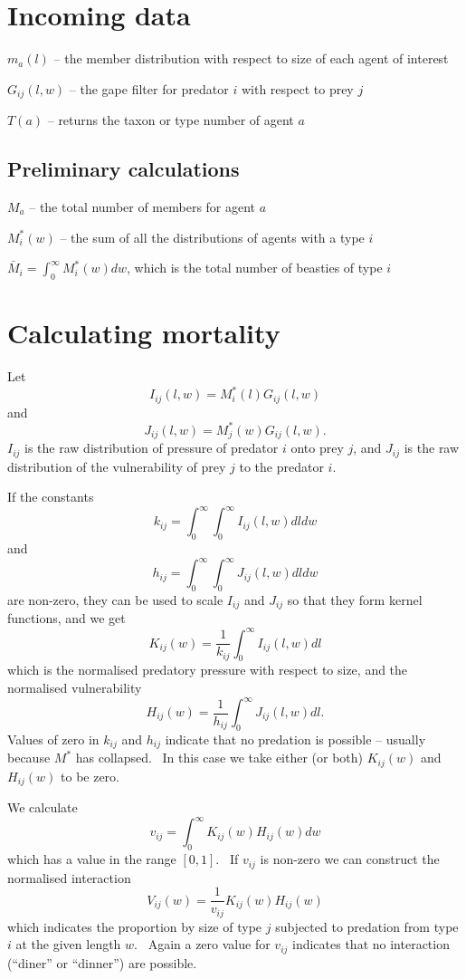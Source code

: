 \documentclass{article}
\begin{document}
\section{Incoming data}

$m_a (l)$ -- the member distribution with respect to size of each agent of
interest

$G_{i j} (l, w)$ -- the gape filter for predator $i$ with respect to prey $j$

$T (a)$ -- returns the taxon or type number of agent $a$

\subsection{Preliminary calculations}

$M_a$ -- the total number of members for agent $a$

$M^{\ast}_i (w)$ -- the sum of all the distributions of agents with a type $i$

$\bar{M}_i = \int_0^{\infty} M^{\ast}_i (w) d w$, which is the total number of
beasties of type $i$

\section{Calculating mortality}

Let
\[ I_{i j} (l, w) = M^{\ast}_i (l) G_{i j} (l, w) \]
and
\[ J_{i j} (l, w) = M^{\ast}_j (w) G_{i j} (l, w) . \]
$I_{i j}$ is the raw distribution of pressure of predator $i$ onto prey $j$,
and $J_{i j}$ is the raw distribution of the vulnerability of prey $j$ to the
predator $i$.

If the constants
\[ k_{i j} = \int_0^{\infty} \int_0^{\infty} I_{i j} (l, w) dl dw \]
and
\[ h_{i j} = \int_0^{\infty} \int_0^{\infty} J_{i j} (l, w) dl dw \]
are non-zero, they can be used to scale $I_{i j}$ and $J_{i j}$ so that they
form kernel functions, and we get
\[ K_{i j} (w) = \frac{1}{k_{i j}} \int_0^{\infty} I_{i j} (l, w) dl \]
which is the normalised predatory pressure with respect to size, and the
normalised vulnerability
\[ H_{i j} (w) = \frac{1}{h_{i j}} \int_0^{\infty} J_{i j} (l, w) dl . \]
Values of zero in $k_{i j}$ and $h_{i j}$ indicate that no predation is
possible -- usually because $M^{\ast}$ has collapsed. \ In this case we take
either (or both) $K_{i j} (w)$ and $H_{i j} (w)$ to be zero.

We calculate
\[ v_{i j} = \int_0^{\infty} K_{i j} (w) H_{i j} (w) dw \]
which has a value in the range $[0, 1]$. \ If $v_{i j}$ is non-zero we can
construct the normalised interaction
\[ V_{i j} (w) = \frac{1}{v_{i j}} K_{i j} (w) H_{i j} (w) \]
which indicates the proportion by size of type $j$ subjected to predation from
type $i$ at the given length $w$. \ Again a zero value for $v_{i j}$ indicates
that no interaction (``diner'' or ``dinner'') are possible.
\end{document}
